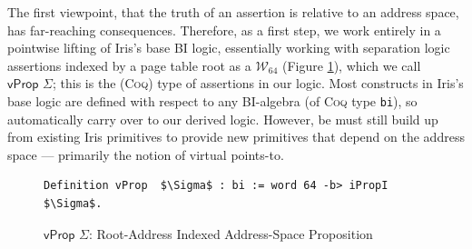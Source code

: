 The first viewpoint, that the truth of an assertion is relative to an address space, has far-reaching consequences.
Therefore, as a first step, we work entirely in a pointwise lifting of Iris's base BI logic,
essentially working with separation logic assertions indexed by a page table root as a $\mathcal{W}_{64}$
(Figure \ref{fig:vprop}), which we call $\textsf{vProp }\Sigma$; this is the (\textsc{Coq}) type of assertions in our logic.
Most constructs in Iris's base logic are defined with respect to any BI-algebra (of \textsc{Coq} type \lstinline|bi|), so automatically
carry over to our derived logic.
However, be must still build up from existing Iris primitives to provide new primitives that depend on the address space --- primarily the notion
of virtual points-to.

\begin{figure}[t]
\begin{lstlisting}[language=Coq]
  Definition vProp  $\Sigma$ : bi := word 64 -b> iPropI  $\Sigma$.
  \end{lstlisting}
\caption{$\textsf{vProp }\Sigma$: Root-Address Indexed Address-Space Proposition}
  \label{fig:vprop}
\end{figure}
